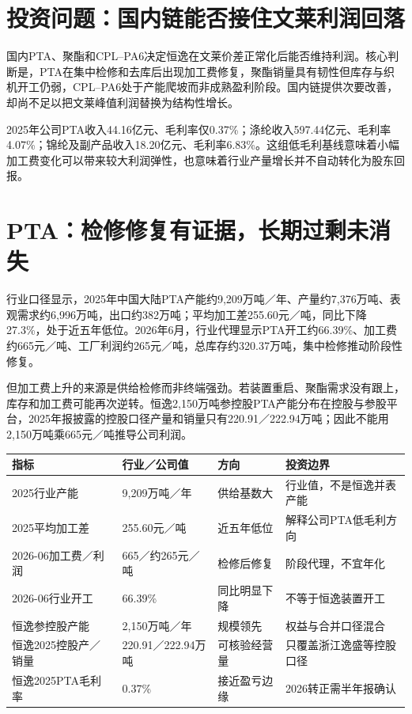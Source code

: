 \section{投资问题：国内链能否接住文莱利润回落}

国内PTA、聚酯和CPL--PA6决定恒逸在文莱价差正常化后能否维持利润。核心判断是，PTA在集中检修和去库后出现加工费修复，聚酯销量具有韧性但库存与织机开工仍弱，CPL--PA6处于产能爬坡而非成熟盈利阶段。国内链提供次要改善，却尚不足以把文莱峰值利润替换为结构性增长。

2025年公司PTA收入44.16亿元、毛利率仅0.37\%；涤纶收入597.44亿元、毛利率4.07\%；锦纶及副产品收入18.20亿元、毛利率6.83\%。这组低毛利基线意味着小幅加工费变化可以带来较大利润弹性，也意味着行业产量增长并不自动转化为股东回报。

\section{PTA：检修修复有证据，长期过剩未消失}

行业口径显示，2025年中国大陆PTA产能约9,209万吨／年、产量约7,376万吨、表观需求约6,996万吨，出口约382万吨；平均加工差255.60元／吨，同比下降27.3\%，处于近五年低位。2026年6月，行业代理显示PTA开工约66.39\%、加工费约665元／吨、工厂利润约265元／吨，总库存约320.37万吨，集中检修推动阶段性修复。

但加工费上升的来源是供给检修而非终端强劲。若装置重启、聚酯需求没有跟上，库存和加工费可能再次逆转。恒逸2,150万吨参控股PTA产能分布在控股与参股平台，2025年报披露的控股口径产量和销量只有220.91／222.94万吨；因此不能用2,150万吨乘665元／吨推导公司利润。

\begin{exhibitbox}[PTA修复的证据与边界]
\noindent\begin{tabularx}{\textwidth}{L{3.1cm}R{2.2cm}L{2.5cm}X}
\toprule
\textbf{指标} & \textbf{行业／公司值} & \textbf{方向} & \textbf{投资边界} \\
\midrule
2025行业产能 & 9,209万吨／年 & 供给基数大 & 行业值，不是恒逸并表产能 \\
2025平均加工差 & 255.60元／吨 & 近五年低位 & 解释公司PTA低毛利方向 \\
2026-06加工费／利润 & 665／约265元／吨 & 检修后修复 & 阶段代理，不宜年化 \\
2026-06行业开工 & 66.39\% & 同比明显下降 & 不等于恒逸装置开工 \\
恒逸参控股产能 & 2,150万吨／年 & 规模领先 & 权益与合并口径混合 \\
恒逸2025控股产／销量 & 220.91／222.94万吨 & 可核验经营量 & 只覆盖浙江逸盛等控股口径 \\
恒逸2025PTA毛利率 & 0.37\% & 接近盈亏边缘 & 2026转正需半年报确认 \\
\bottomrule
\end{tabularx}
\end{exhibitbox}

